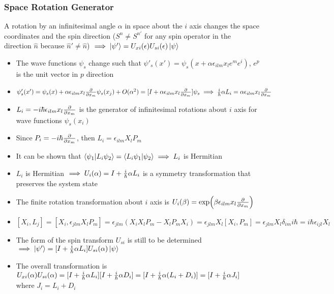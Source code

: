 \documentclass[8pt,t,mathserif,aspectratio=169]{beamer}
\begin{document}
\begin{frame}
  \frametitle{Space Rotation Generator}
  \vspace{1mm}
  A rotation by an infinitesimal angle $\alpha$ in space about the $i$ axis changes the space coordinates and the spin direction ($S^n \neq S^{n'}$ for any spin operator in the direction $\hat{n}$ because $\hat{n}' \neq \hat{n}$) $\implies \ket{\psi'} = U_{xi}(\epsilon) U_{si}(\epsilon) \ket{\psi}$
  \begin{itemize}
    \item The wave functions $\psi_s$ change such that $\psi'_s(x') = \psi_s(x + \alpha \epsilon_{ilm} x_l e^m e^i)$, $e^p$ is the unit vector in $p$ direction
    \item $\psi'_s(x') = \psi_s(x) + \alpha \epsilon_{ilm} x_l {\partial \over \partial x_m} \psi_s(x_j) + O(\alpha^2) = [I + \alpha \epsilon_{ilm} x_l {\partial \over \partial x_m}] \psi_s \implies {i \over \hbar} \alpha L_i = \alpha \epsilon_{ilm} x_l {\partial \over \partial x_m}$
    \item $L_i = -i \hbar \epsilon_{ilm} x_l {\partial \over \partial x_m}$ is the generator of infinitesimal rotations about $i$ axis for wave functions $\psi_s(x_i)$
    \item Since $P_i = -i \hbar {\partial \over \partial x_m}$, then $L_i = \epsilon_{ilm} X_l P_m$
    \item It can be shown that $\bra{\psi_1}\ket{L_i \psi_2} = \bra{L_i \psi_1} \ket{\psi_2} \implies L_i$ is Hermitian 
    \item $L_i$ is Hermitian $\implies U_i(\alpha) = I + {i \over \hbar} \alpha L_i$ is a symmetry transformation that preserves the system state
    \item The finite rotation transformation about $i$ axis is $U_i(\beta) = \exp(\beta \epsilon_{ilm} x_l {\partial \over \partial x_m})$
    \item $[X_i,L_j] = [X_i,\epsilon_{jlm} X_l P_m] = \epsilon_{jlm} (X_i X_l P_m - X_l P_m X_i) = \epsilon_{jlm} X_l [X_i,P_m] = \epsilon_{jlm} X_l \delta_{im} i \hbar = i \hbar \epsilon_{ijl} X_l$
    \item The form of the spin transform $U_{si}$ is still to be determined $\implies \ket{\psi'} = [I + {i \over \hbar} \alpha L_i] U_{si}(\alpha) \ket{\psi}$
    \item The overall transformation is $U_{xi}(\alpha) U_{si}(\alpha) = [I + {i \over \hbar} \alpha L_i] [I + {i \over \hbar} \alpha D_i] = [I + {i \over \hbar} \alpha (L_i + D_i)] = [I + {i \over \hbar} \alpha J_i]$ where $J_i = L_i + D_i$
  \end{itemize}
\end{frame}
\end{document}
